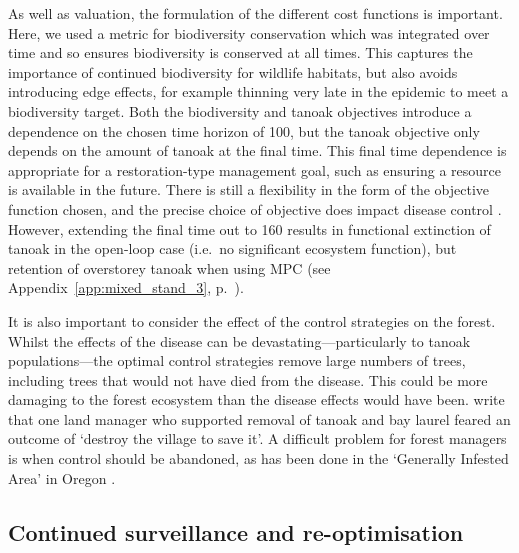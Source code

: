 As well as valuation, the formulation of the different cost functions is important. Here, we used a metric for biodiversity conservation which was integrated over time and so ensures biodiversity is conserved at all times. This captures the importance of continued biodiversity for wildlife habitats, but also avoids introducing edge effects, for example thinning very late in the epidemic to meet a biodiversity target. Both the biodiversity and tanoak objectives introduce a dependence on the chosen time horizon of \SI{100}{\years}, but the tanoak objective only depends on the amount of tanoak at the final time. This final time dependence is appropriate for a restoration-type management goal, such as ensuring a resource is available in the future. There is still a flexibility in the form of the objective function chosen, and the precise choice of objective does impact disease control \citep{probert_decision_2016}. However, extending the final time out to \SI{160}{\years} results in functional extinction of tanoak in the open-loop case (i.e.\ no significant ecosystem function), but retention of overstorey tanoak when using MPC (see Appendix~\ref{app:mixed_stand_3}, p.~\pageref{app:mixed_stand_3}).

It is also important to consider the effect of the control strategies on the forest. Whilst the effects of the disease can be devastating---particularly to tanoak populations---the optimal control strategies remove large numbers of trees, including trees that would not have died from the disease. This could be more damaging to the forest ecosystem than the disease effects would have been. \citet{alexander_lessons_2010} write that one land manager who supported removal of tanoak and bay laurel feared an outcome of `destroy the village to save it'. A difficult problem for forest managers is when control should be abandoned, as has been done in the `Generally Infested Area' in Oregon \citep{hansen_efficacy_2019}.

\subsection{Continued surveillance and re-optimisation}

